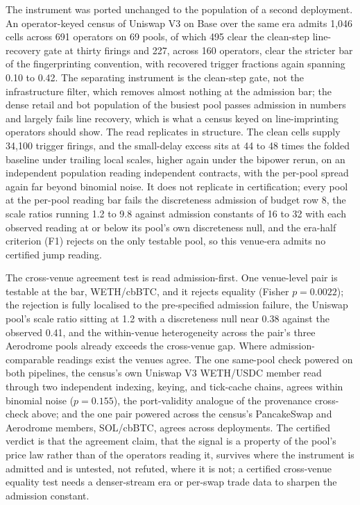 \documentclass[11pt,a4paper]{article}
\theoremstyle{definition}
\theoremstyle{plain}
\theoremstyle{remark}
\begin{document}
The instrument was ported unchanged to the population of a second deployment. An operator-keyed census of Uniswap V3 on Base over the same era admits 1{,}046 cells across 691 operators on 
69 pools, of which 495 clear the clean-step line-recovery gate at thirty firings and 227, across 160 operators, clear the stricter bar of the fingerprinting convention, with recovered trigger 
fractions again spanning 0.10 to 0.42. The separating instrument is the clean-step gate, not the infrastructure filter, which removes almost nothing at the admission bar; the dense retail and 
bot population of the busiest pool passes admission in numbers and largely fails line recovery, which is what a census keyed on line-imprinting operators should show. The read replicates in 
structure. The clean cells supply 34{,}100 trigger firings, and the small-delay excess sits at 44 to 48 times the folded baseline under trailing local scales, higher again under the bipower 
rerun, on an independent population reading independent contracts, with the per-pool spread again far beyond binomial noise. It does not replicate in certification; every pool at the per-pool 
reading bar fails the discreteness admission of budget row 8, the scale ratios running 1.2 to 9.8 against admission constants of 16 to 32 with each observed reading at or below its pool's own 
discreteness null, and the era-half criterion (F1) rejects on the only testable pool, so this venue-era admits no certified jump reading.

The cross-venue agreement test is read admission-first. One venue-level pair is testable at the bar, WETH/cbBTC, and it rejects equality (Fisher $p = 0.0022$); the rejection is fully localised 
to the pre-specified admission failure, the Uniswap pool's scale ratio sitting at 1.2 with a discreteness null near 0.38 against the observed 0.41, and the within-venue heterogeneity across 
the pair's three Aerodrome pools already exceeds the cross-venue gap. Where admission-comparable readings exist the venues agree. The one same-pool check powered on both pipelines, the census's 
own Uniswap V3 WETH/USDC member read through two independent indexing, keying, and tick-cache chains, agrees within binomial noise ($p = 0.155$), the port-validity analogue of the provenance 
cross-check above; and the one pair powered across the census's PancakeSwap and Aerodrome members, SOL/cbBTC, agrees across deployments. The certified verdict is that the agreement claim, that 
the signal is a property of the pool's price law rather than of the operators reading it, survives where the instrument is admitted and is untested, not refuted, where it is not; a certified 
cross-venue equality test needs a denser-stream era or per-swap trade data to sharpen the admission constant.
\end{document}
